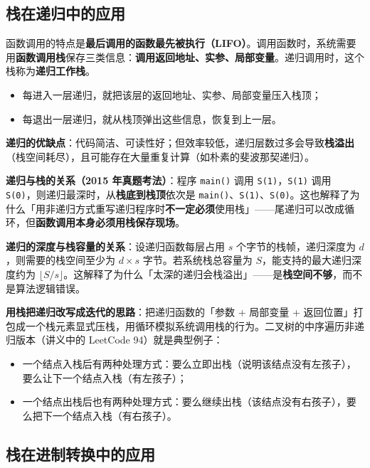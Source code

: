\documentclass[11pt,openany,UTF8]{ctexbook}
\begin{document}
\subsection{栈在递归中的应用}

函数调用的特点是\textbf{最后调用的函数最先被执行（LIFO）}。调用函数时，系统需要用\textbf{函数调用栈}保存三类信息：\textbf{调用返回地址、实参、局部变量}。递归调用时，这个栈称为\textbf{递归工作栈}。

\begin{itemize}
\item 每进入一层递归，就把该层的返回地址、实参、局部变量压入栈顶；
\item 每退出一层递归，就从栈顶弹出这些信息，恢复到上一层。
\end{itemize}
\textbf{递归的优缺点}：代码简洁、可读性好；但效率较低，递归层数过多会导致\textbf{栈溢出}（栈空间耗尽），且可能存在大量重复计算（如朴素的斐波那契递归）。

\textbf{递归与栈的关系（2015 年真题考法）}：程序 \texttt{main()\allowbreak{}} 调用 \texttt{S(1)\allowbreak{}}，\texttt{S(1)\allowbreak{}} 调用 \texttt{S(0)\allowbreak{}}，则递归最深时，从\textbf{栈底到栈顶}依次是 \texttt{main()\allowbreak{}}、\texttt{S(1)\allowbreak{}}、\texttt{S(0)\allowbreak{}}。这也解释了为什么「用非递归方式重写递归程序时\textbf{不一定必须}使用栈」——尾递归可以改成循环，但\textbf{函数调用本身必须用栈保存现场}。

\textbf{递归的深度与栈容量的关系}：设递归函数每层占用 $s$ 个字节的栈帧，递归深度为 $d$，则需要的栈空间至少为 $d \times s$ 字节。若系统栈总容量为 $S$，能支持的最大递归深度约为 $\lfloor S / s \rfloor$。这解释了为什么「太深的递归会栈溢出」——是\textbf{栈空间不够}，而不是算法逻辑错误。

\textbf{用栈把递归改写成迭代的思路}：把递归函数的「参数 + 局部变量 + 返回位置」打包成一个栈元素显式压栈，用循环模拟系统调用栈的行为。二叉树的中序遍历非递归版本（讲义中的 LeetCode 94）就是典型例子：

\begin{itemize}
\item 一个结点入栈后有两种处理方式：要么立即出栈（说明该结点没有左孩子），要么让下一个结点入栈（有左孩子）；
\item 一个结点出栈后也有两种处理方式：要么继续出栈（该结点没有右孩子），要么把下一个结点入栈（有右孩子）。
\end{itemize}
\subsection{栈在进制转换中的应用}
\end{document}

